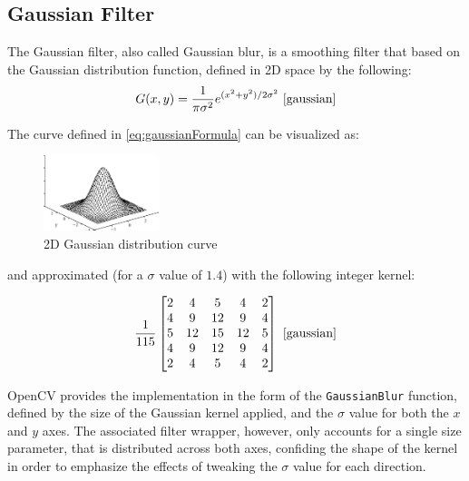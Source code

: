 \subsection{Gaussian Filter}

The Gaussian filter, also called Gaussian blur, is a smoothing filter that based on the
Gaussian distribution function, defined in 2D space by the following:
\begin{equation}
	\label{eq:gaussianFormula}
	G(x, y) = {1\over\pi \sigma^2}{e^{(x^2 + y^2) / 2\sigma^2}}
	\text{ \cite{gaussian}}
\end{equation}

The curve defined in \cref{eq:gaussianFormula} can be visualized as:
\begin{figure}[H]
	\includegraphics[width=0.30\textwidth, height=0.30\textwidth]{resources/Gaussian_Distribution.png}
	\caption{2D Gaussian distribution curve \cite{gaussian}}
\end{figure}

and approximated (for a \(\sigma\) value of \(1.4\)) with the following integer kernel:

\begin{equation}
	\label{eq:gaussianKernel}
	{1\over115}
	\begin{bmatrix}
		2 & 4  & 5  & 4  & 2 \\
		4 & 9  & 12 & 9  & 4 \\
		5 & 12 & 15 & 12 & 5 \\
		4 & 9  & 12 & 9  & 4 \\
		2 & 4  & 5  & 4  & 2 \\
	\end{bmatrix}
	\text{ \cite{gaussian}}
\end{equation}

OpenCV provides the implementation in the form of the \verb|GaussianBlur| function, defined by the size of
the Gaussian kernel applied, and the \(\sigma\) value for both the \(x\) and \(y\) axes. The associated
filter wrapper, however, only accounts for a single size parameter, that is distributed across both axes,
confiding the shape of the kernel in order to emphasize the effects of tweaking the \(\sigma\) value for
each direction.

